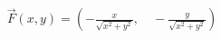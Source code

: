 \documentclass[preview]{standalone}
\begin{document}
\begin{align*}
\vec{F}(x, y) = \left( -\frac{x}{\sqrt{x^2 + y^2}}, \quad -\frac{y}{\sqrt{x^2 + y^2}} \right)
\end{align*}
\end{document}
